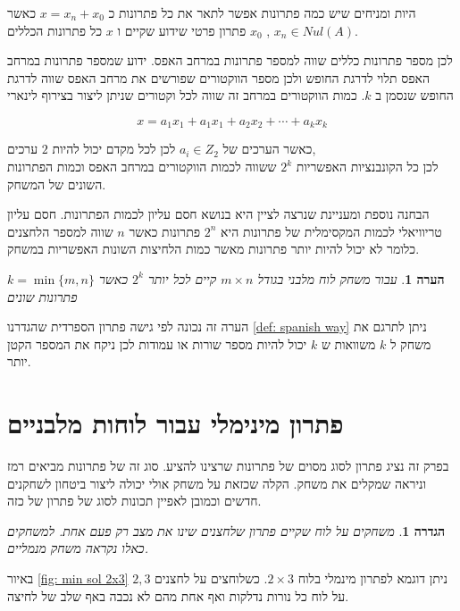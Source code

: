 \documentclass[12pt,leqno]{article}
\theoremstyle{theoremdd}
\newtheorem{definition}{הגדרה}[section]
\newtheorem{comm}{הערה}[section]
\begin{document}
היות ומניחים שיש כמה פתרונות אפשר לתאר את כל פתרונות כ
$x = x_n + x_0$
כאשר 
$x_n \in Nul(A)$ ,
$x_0$ 
פתרון פרטי שידוע שקיים 
ו
$x$
כל פתרונות הכללים.

לכן מספר פתרונות כללים שווה למספר פתרונות במרחב האפס.
ידוע שמספר פתרונות במרחב האפס תלוי לדרגת החופש ולכן מספר הווקטורים שפורשים
את מרחב האפס שווה לדרגת החופש שנסמן ב
$k$.
כמות הווקטורים במרחב זה שווה לכל וקטורים שניתן ליצור בצירוף לינארי 

\[x = a_1 x_1 + a_1 x_1 + a_2 x_2 + \cdots + a_k x_k\]

כאשר הערכים של
$a_i \in Z_2$
לכן 
לכל מקדם יכול להיות
$2$
ערכים,
\\
לכן כל הקונבנציות האפשריות 
$2^k$
ששווה
לכמות הווקטורים 
במרחב האפס וכמות הפתרונות השונים של המשחק.

הבחנה נוספת ומעניינת שנרצה לציין היא בנושא חסם עליון לכמות הפתרונות.
חסם עליון טריוויאלי לכמות המקסימלית של פתרונות היא 
$2^n$
פתרונות כאשר
$n$
שווה למספר הלחצנים כלומר לא יכול להיות יותר פתרונות מאשר כמות הלחיצות השונות האפשריות במשחק.

\begin{comm}
    עבור משחק לוח מלבני
    בגודל 
    $m \times n$
    קיים לכל יותר 
    $2^k$
    כאשר 
    $k = \min\{m,n\}$
    פתרונות שונים
\end{comm}
הערה זה נכונה לפי גישה פתרון הספרדית
שהגדרנו
\ref{def: spanish way}
ניתן לתרגם את משחק ל
$k$
משוואות 
ש
$k$
יכול להיות מספר שורות או עמודות 
לכן ניקח את המספר הקטן יותר.


\section{פתרון מינימלי עבור לוחות מלבניים}
בפרק זה נציג פתרון לסוג מסוים של פתרונות שרצינו להציע. סוג זה של פתרונות 
מביאים רמז וניראה שמקלים את משחק. הקלה שכזאת על משחק אולי 
יכולה ליצור ביטחון לשחקנים חדשים וכמובן לאפיין תכונות לסוג של פתרון של כזה.

\begin{definition}
משחקים על לוח שקיים פתרון שלחצנים 
שינו את מצב רק פעם אחת.
למשחקים כאלו נקראה משחק מנמליים.
\end{definition}

באיור 
\ref{fig: min sol 2x3}
ניתן דוגמא לפתרון מינמלי 
בלוח 
$2 \times 3$.
כשלוחצים על לחצנים 
$2, 3$
על לוח כל נורות נדלקות ואף 
אחת מהם לא נכבה באף שלב של לחיצה.
\end{document}
